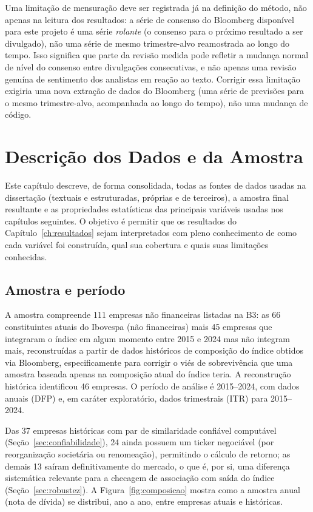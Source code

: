 \documentclass[a4paper,12pt]{report}
\begin{document}
Uma limitação de mensuração deve ser registrada já na definição do método, não apenas na leitura dos resultados: a série de consenso do Bloomberg disponível para este projeto é uma série \textit{rolante} (o consenso para o próximo resultado a ser divulgado), não uma série de mesmo trimestre-alvo reamostrada ao longo do tempo. Isso significa que parte da revisão medida pode refletir a mudança normal de nível do consenso entre divulgações consecutivas, e não apenas uma revisão genuína de sentimento dos analistas em reação ao texto. Corrigir essa limitação exigiria uma nova extração de dados do Bloomberg (uma série de previsões para o mesmo trimestre-alvo, acompanhada ao longo do tempo), não uma mudança de código.

\chapter{Descrição dos Dados e da Amostra}
\label{ch:dados}

Este capítulo descreve, de forma consolidada, todas as fontes de dados usadas na dissertação (textuais e estruturadas, próprias e de terceiros), a amostra final resultante e as propriedades estatísticas das principais variáveis usadas nos capítulos seguintes. O objetivo é permitir que os resultados do Capítulo~\ref{ch:resultados} sejam interpretados com pleno conhecimento de como cada variável foi construída, qual sua cobertura e quais suas limitações conhecidas.

\section{Amostra e período}
\label{sec:amostra}

A amostra compreende 111 empresas não financeiras listadas na B3: as 66 constituintes atuais do Ibovespa (não financeiras) mais 45 empresas que integraram o índice em algum momento entre 2015 e 2024 mas não integram mais, reconstruídas a partir de dados históricos de composição do índice obtidos via Bloomberg, especificamente para corrigir o viés de sobrevivência que uma amostra baseada apenas na composição atual do índice teria. A reconstrução histórica identificou 46 empresas. O período de análise é 2015--2024, com dados anuais (DFP) e, em caráter exploratório, dados trimestrais (ITR) para 2015--2024.

Das 37 empresas históricas com par de similaridade confiável computável (Seção~\ref{sec:confiabilidade}), 24 ainda possuem um ticker negociável (por reorganização societária ou renomeação), permitindo o cálculo de retorno; as demais 13 saíram definitivamente do mercado, o que é, por si, uma diferença sistemática relevante para a checagem de associação com saída do índice (Seção~\ref{sec:robustez}). A Figura~\ref{fig:composicao} mostra como a amostra anual (nota de dívida) se distribui, ano a ano, entre empresas atuais e históricas.
\end{document}
